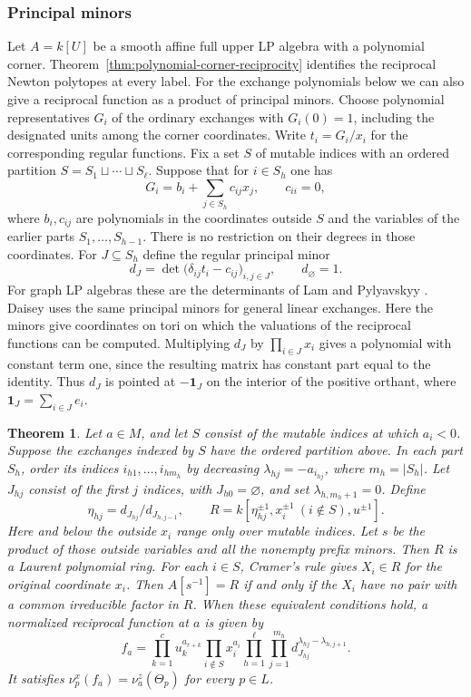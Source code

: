\documentclass[11pt,reqno]{amsart}
\numberwithin{equation}{section}
\newtheorem{theorem}{Theorem}[section]
\theoremstyle{definition}
\theoremstyle{remark}
\begin{document}
\subsubsection{Principal minors}

Let \(A=k[U]\) be a smooth affine full upper LP algebra with a
polynomial corner. Theorem~\ref{thm:polynomial-corner-reciprocity}
identifies the reciprocal Newton polytopes at every label. For the
exchange polynomials below we can also give a reciprocal function
as a product of principal minors. Choose polynomial representatives
\(G_i\) of the ordinary exchanges with \(G_i(0)=1\), including the
designated units among the corner coordinates. Write \(t_i=G_i/x_i\)
for the corresponding regular functions.
Fix a set \(S\) of mutable indices with an ordered partition
\(S=S_1\sqcup\cdots\sqcup S_\ell\). Suppose that for \(i\in S_h\)
one has
\[ G_i=b_i+\sum_{j\in S_h}c_{ij}x_j,\qquad c_{ii}=0 , \]
where \(b_i,c_{ij}\) are polynomials in the coordinates outside \(S\)
and the variables of the earlier parts \(S_1,\ldots,S_{h-1}\).
There is no restriction on their degrees in those coordinates.
For \(J\subseteq S_h\) define the regular principal minor
\[ d_J=\det\bigl(\delta_{ij}t_i-c_{ij}\bigr)_{i,j\in J}, \qquad d_\varnothing=1. \]
For graph LP algebras these are the determinants of Lam and
Pylyavskyy \cite[\S4.2, Proposition~4.5]{LPlinear}. Daisey
\cite[\S4]{Daisey} uses the same principal minors for general
linear exchanges. Here the minors give coordinates on tori on which
the valuations of the reciprocal functions can be computed.
Multiplying \(d_J\) by \(\prod_{i\in J}x_i\) gives a polynomial
with constant term one, since the resulting matrix has constant
part equal to the identity. Thus \(d_J\) is pointed at
\(-\mathbf1_J\) on the interior of the positive orthant, where
\(\mathbf1_J=\sum_{i\in J}e_i\).

\begin{theorem}\label{thm:principal-minor-reciprocity}
Let \(a\in M\), and let \(S\) consist of the mutable indices at which
\(a_i<0\). Suppose the exchanges indexed by \(S\) have the ordered partition
above. In each part \(S_h\), order its indices
\(i_{h1},\ldots,i_{hm_h}\) by decreasing
\(\lambda_{hj}=-a_{i_{hj}}\), where \(m_h=|S_h|\). Let \(J_{hj}\) consist of the first
\(j\) indices, with \(J_{h0}=\varnothing\), and set \(\lambda_{h,m_h+1}=0\). Define
\[ \eta_{hj}=d_{J_{hj}}/d_{J_{h,j-1}},\qquad R=k[\eta_{hj}^{\pm1},x_i^{\pm1}\ (i\notin S),u^{\pm1}]. \]
Here and below the outside \(x_i\) range only over mutable indices.
Let \(s\) be the product of those outside variables and all the
nonempty prefix minors. Then \(R\) is a Laurent polynomial ring.
For each \(i\in S\), Cramer's rule gives \(X_i\in R\)
for the original coordinate \(x_i\). Then \(A[s^{-1}]=R\) if and
only if the \(X_i\) have no pair with a common irreducible factor
in \(R\). When these equivalent conditions hold, a normalized
reciprocal function at \(a\) is given by
\[ f_a=\prod_{k=1}^c u_k^{a_{r+k}}\prod_{i\notin S}x_i^{a_i}\prod_{h=1}^\ell\prod_{j=1}^{m_h} d_{J_{hj}}^{\lambda_{hj}-\lambda_{h,j+1}}. \]
It satisfies \(\nu^x_p(f_a)=\nu^z_a(\Theta_p)\) for every \(p\in L\).
\end{theorem}
\end{document}
